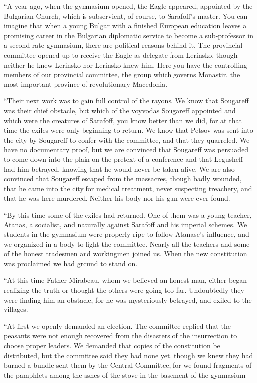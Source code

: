 \documentclass[a5paper,12pt]{book}
\begin{document}
“A year ago, when the gymnasium opened, the Eagle appeared, appointed by the Bulgarian Church, which is subservient, of course, to Sarafoff’s master. You can imagine that when a young Bulgar with a finished European education leaves a promising career in the Bulgarian diplomatic service to become a sub-professor in a second rate gymnasium, there are political reasons behind it. The provincial committee opened up to receive the Eagle as delegate from Lerinsko, though neither he knew Lerinsko nor Lerinsko knew him. Here you have the controlling members of our provincial committee, the group which governs Monastir, the most important province of revolutionary Macedonia. 

“Their next work was to gain full control of the rayons. We know that Sougareff was their chief obstacle, but which of the voyvodas Sougareff appointed and which were the creatures of Sarafoff, you know better than we did, for at that time the exiles were only beginning to return. We know that Petsov was sent into the city by Sougareff to confer with the committee, and that they quarreled. We have no documentary proof, but we are convinced that Sougareff was persuaded to come down into the plain on the pretext of a conference and that Legusheff had him betrayed, knowing that he would never be taken alive. We are also convinced that Sougareff escaped from the massacres, though badly wounded, that he came into the city for medical treatment, never suspecting treachery, and that he was here murdered. Neither his body nor his gun were ever found. 

“By this time some of the exiles had returned. One of them was a young teacher, Atanas, a socialist, and naturally against Sarafoff and his imperial schemes. We students in the gymnasium were properly ripe to follow Atanase’s influence, and we organized in a body to fight the committee. Nearly all the teachers and some of the honest tradesmen and workingmen joined us. When the new constitution was proclaimed we had ground to stand on. 

“At this time Father Mirabeau, whom we believed an honest man, either began realizing the truth or thought the others were going too far. Undoubtedly they were finding him an obstacle, for he was mysteriously betrayed, and exiled to the villages. 

“At first we openly demanded an election. The committee replied that the peasants were not enough recovered from the disasters of the insurrection to choose proper leaders. We demanded that copies of the constitution be distributed, but the committee said they had none yet, though we knew they had burned a bundle sent them by the Central Committee, for we found fragments of the pamphlets among the ashes of the stove in the basement of the gymnasium 
\end{document}
